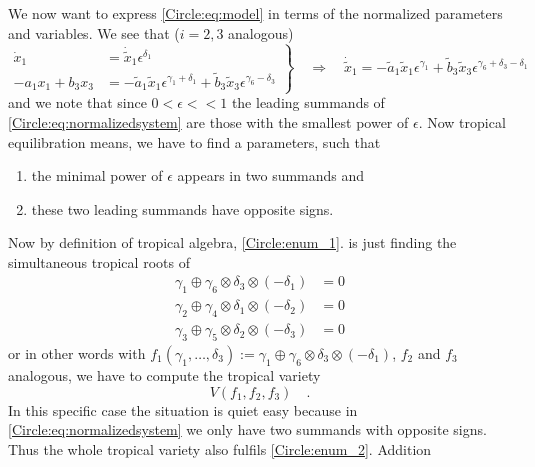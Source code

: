 	We now want to express \eqref{Circle:eq:model} in terms of the normalized parameters 
	and variables. We see that ($i=2,3$ analogous)
	\begin{equation} 
	\left.\begin{aligned}
	\dot{x}_1 &= \dot{\tilde{x}}_1 \epsilon^{\delta_1} \\
	-a_1 x_1 + b_3 x_3 &= -  \tilde{a}_1\tilde{x}_1 \epsilon^{\gamma_1+\delta_1} +
	 \tilde{b}_3 \tilde{x}_3 
	\epsilon^{\gamma_6-\delta_3}	
	 \end{aligned} \right\} \quad \Rightarrow \quad 
	 \dot{\tilde{x}}_1 = 
	 -  \tilde{a}_1\tilde{x}_1 \epsilon^{\gamma_1} +
	 \tilde{b}_3 \tilde{x}_3 
	\epsilon^{\gamma_6+\delta_3-\delta_1}	\label{Circle:eq:normalizedsystem}
	\end{equation}
	and we note that since $0<\epsilon << 1$ the leading summands of 
	\eqref{Circle:eq:normalizedsystem} are those with the smallest power of $\epsilon$.  
	Now tropical equilibration means, we have to find a parameters, such that 
	\begin{enumerate}
	\item the minimal power of $\epsilon$ appears in two summands and 
	\label{Circle:enum_1}
	\item these two leading summands have opposite signs.\label{Circle:enum_2}
	\end{enumerate}
	Now by definition of tropical algebra, \ref{Circle:enum_1}. is just finding the 
	simultaneous tropical roots of
	\begin{equation}\begin{aligned}
		\gamma_1 \oplus \gamma_6 \otimes \delta_3 \otimes (-\delta_1) &= 0 \\
		\gamma_2 \oplus \gamma_4 \otimes \delta_1 \otimes (-\delta_2) &= 0 \\
		\gamma_3 \oplus \gamma_5 \otimes \delta_2 \otimes (-\delta_3) &= 0
	\end{aligned} \label{Circle:eq:tropVar}
	\end{equation}
	or in other words with $f_1(\gamma_1,\ldots,\delta_3) := \gamma_1 \oplus 
	\gamma_6\otimes\delta_3\otimes(-\delta_1)$, $f_2$ and $f_3$ analogous, we have to 	
	compute the tropical variety
	\begin{equation}
		V (f_1,f_2,f_3) \quad .
	\end{equation}
	In this specific case the situation is quiet easy because in 
	\eqref{Circle:eq:normalizedsystem} we only have two summands with opposite signs. 
	Thus the whole tropical variety also fulfils \ref{Circle:enum_2}. Addition 
